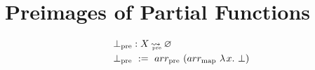 \documentclass[preprint]{sigplanconf}
\newcommand{\arrowarr}{\ensuremath{arr}}
\newcommand{\map}{_\mathrm{map}}
\newcommand{\arrmap}{\arrowarr\map}
\newcommand{\pre}{_\mathrm{pre}}
\DeclareMathOperator{\preto}{\rightsquigarrow_{\mspace{-19mu}\pre}}
\newcommand{\arrpre}{\arrowarr\pre}
\begin{document}
\section{Preimages of Partial Functions}

\begin{equation}
\begin{aligned}
	&\bot\pre : X \preto \emptyset \\
	&\bot\pre \ := \ \arrpre~(\arrmap~\fun{x}\bot)
\end{aligned}
\end{equation}






\end{document}
